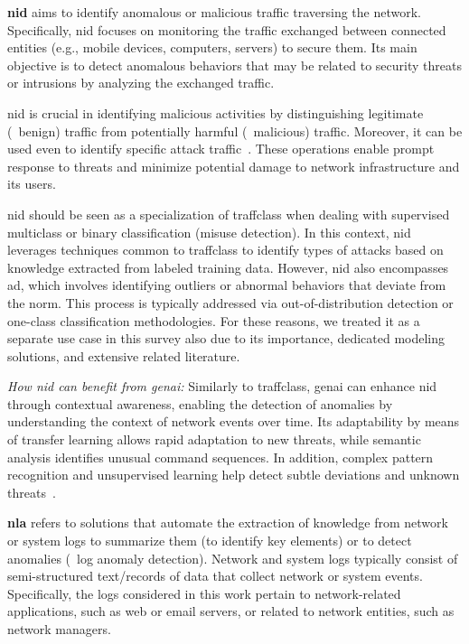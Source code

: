\vspace{5pt}
\noindent
\textbf{\gls{nid}} aims to identify anomalous or malicious traffic traversing the network.
Specifically, \gls{nid} focuses on monitoring the traffic exchanged between connected entities (e.g., mobile devices, computers, servers) to secure them. 
Its main objective is to detect anomalous behaviors that may be related to security threats or intrusions by analyzing the exchanged traffic. 

\gls{nid} is crucial in identifying malicious activities by distinguishing legitimate (\viz~benign) traffic from potentially harmful (\viz~malicious) traffic. Moreover, it can be used even to identify specific attack traffic~\cite{chou2021survey}. These operations enable prompt response to threats and minimize potential damage to network infrastructure and its users. 

\gls{nid} should be seen as a specialization of \gls{traffclass} when dealing with supervised multiclass or binary classification (\viz misuse detection). In this context, \gls{nid} leverages techniques common to \gls{traffclass} to identify types of attacks based on knowledge extracted from labeled training data. However, \gls{nid} also encompasses \gls{ad}, which involves identifying outliers or abnormal behaviors that deviate from the norm. This process is typically addressed via out-of-distribution detection or one-class classification methodologies. 
For these reasons, we treated it as a separate use case in this survey also due to its importance, dedicated modeling solutions, and extensive related literature.



\noindent
\emph{How \gls{nid} 
can benefit from \gls{genai}: }
Similarly to \gls{traffclass}, \gls{genai} can enhance \gls{nid} through contextual awareness, enabling the detection of anomalies by understanding the context of network events over time. Its adaptability by means of transfer learning allows rapid adaptation to new threats, while semantic analysis identifies unusual command sequences. In addition, complex pattern recognition and unsupervised learning help detect subtle deviations and unknown threats~\cite{manocchio2024flowtransformer, ferrag2024}.


\vspace{5pt}
\noindent
\textbf{\gls{nla}} refers to solutions that automate the extraction of knowledge from network or system logs to summarize them (\ie to identify key elements) or to detect anomalies (\viz~log anomaly detection).
Network and system logs typically consist of semi-structured text/records of data that collect network or system events.
Specifically, the logs considered in this work pertain to network-related applications, such as web or email servers, or related to network entities, such as network managers.

